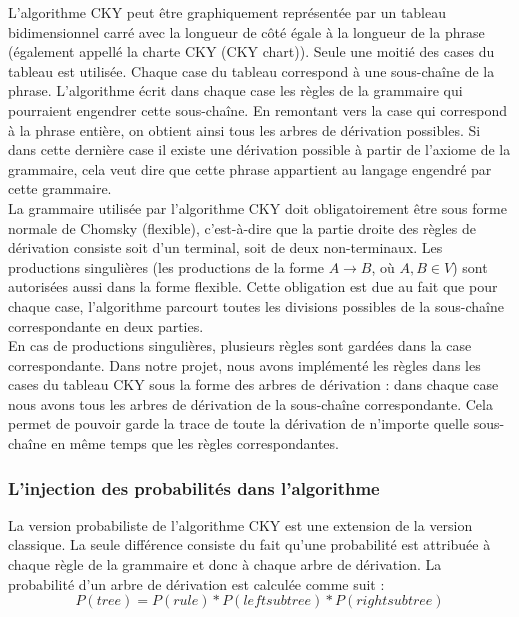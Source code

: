 \documentclass[12pt]{article}
\begin{document}
L'algorithme CKY peut
\^etre graphiquement repr\'esent\'ee par un tableau bidimensionnel carr\'e avec la longueur de côt\'e \'egale \`a la longueur de la phrase (\'egalement appell\'e la charte CKY (CKY chart)).
Seule une moiti\'e des cases du tableau est utilis\'ee. Chaque case du tableau correspond \`a une sous-cha\^ine de la phrase.
L'algorithme \'ecrit dans chaque case les r\`egles de la grammaire qui pourraient
engendrer cette sous-cha\^ine. En remontant vers la case qui correspond \`a la
phrase enti\`ere, on obtient ainsi tous les arbres de d\'erivation possibles. Si
dans cette derni\`ere case il existe une d\'erivation possible \`a partir de l'axiome
de la grammaire, cela veut dire que cette phrase appartient au langage engendr\'e
par cette grammaire.\\

La grammaire utilis\'ee par l'algorithme CKY doit obligatoirement \^etre sous forme
normale de Chomsky (flexible), c'est-\`a-dire que la partie droite des r\`egles de
d\'erivation consiste soit d'un terminal, soit de deux non-terminaux. Les productions
singuli\`eres (les productions de la forme $A \rightarrow B$, o\`u $A,B \in V$) sont
autoris\'ees aussi dans la forme flexible. Cette obligation est
due au fait que pour chaque case, l'algorithme parcourt toutes les divisions possibles de la sous-cha\^ine
correspondante en deux parties. \\

En cas de productions singuli\`eres, plusieurs r\`egles sont gard\'ees dans la case
correspondante. Dans notre projet, nous avons impl\'ement\'e les r\`egles dans les
cases du tableau CKY sous la forme des arbres de d\'erivation : dans chaque case
nous avons tous les arbres de d\'erivation de la sous-cha\^ine correspondante. Cela
permet de pouvoir garde la trace de toute la d\'erivation de n'importe quelle
sous-cha\^ine en m\^eme temps que les r\`egles correspondantes. 

\subsubsection{L'injection des probabilit\'es dans l'algorithme}

La version probabiliste de l'algorithme CKY est une extension de la version
classique. La seule diff\'erence consiste du fait qu'une probabilit\'e est attribu\'ee
\`a chaque r\`egle de la grammaire et donc \`a chaque arbre de d\'erivation. La
probabilit\'e d'un arbre de d\'erivation est calcul\'ee comme suit : 
$$P(tree) = P(rule) * P(left subtree) * P(right subtree)$$
\end{document}
